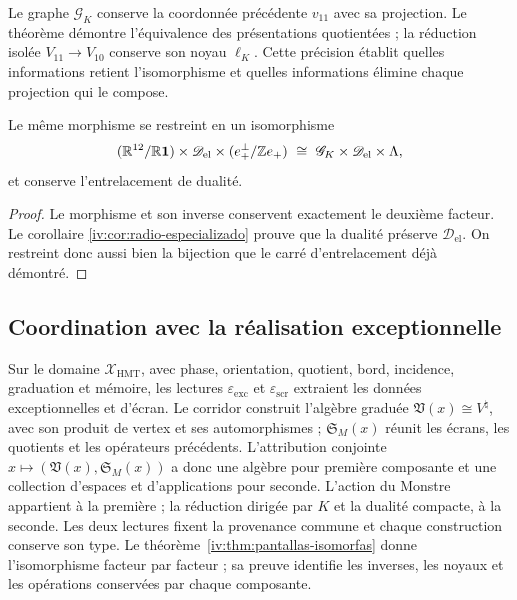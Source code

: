 Le graphe \(\mathscr G_K\) conserve la coordonnée précédente
\(v_{11}\) avec sa projection. Le théorème démontre
l’équivalence des présentations quotientées ; la réduction
isolée \(V_{11}\to V_{10}\) conserve son noyau
\(\ell_K\). Cette précision établit quelles informations
retient l’isomorphisme et quelles informations élimine chaque
projection qui le compose.


\begin{corollary}
Le même morphisme se restreint en un isomorphisme
\[
 (\mathbb R^{12}/\mathbb R\mathbf1)\times\mathscr D_{\mathrm{el}}
 \times(e_+^\perp/\mathbb Z e_+)
 \ \cong\ \mathscr G_K\times\mathscr D_{\mathrm{el}}\times\Lambda,
\]
et conserve l’entrelacement de dualité.
\end{corollary}
\begin{proof}
Le morphisme et son inverse conservent exactement le deuxième facteur.
Le corollaire \ref{iv:cor:radio-especializado} prouve que la dualité
préserve \(\mathscr D_{\mathrm{el}}\). On restreint donc
aussi bien la bijection que le carré d’entrelacement déjà démontré.
\end{proof}

\subsection{Coordination avec la réalisation exceptionnelle}

Sur le domaine \(\mathcal X_{\mathrm{HMT}}\), avec phase, orientation,
quotient, bord, incidence, graduation et mémoire, les lectures
\(\varepsilon_{\mathrm{exc}}\) et \(\varepsilon_{\mathrm{scr}}\) extraient
les données exceptionnelles et d’écran. Le corridor construit l’algèbre
graduée \(\mathfrak V(x)\cong V^\natural\), avec son produit de vertex
et ses automorphismes ; \(\mathfrak S_M(x)\) réunit les écrans, les quotients
et les opérateurs précédents. L’attribution conjointe
\(x\mapsto(\mathfrak V(x),\mathfrak S_M(x))\) a donc une
algèbre pour première composante et une collection d’espaces et d’applications pour seconde.
L’action du Monstre appartient à la première ; la réduction dirigée par \(K\)
et la dualité compacte, à la seconde. Les deux lectures fixent la provenance
commune et chaque construction conserve son type.
Le théorème~\ref{iv:thm:pantallas-isomorfas} donne l’isomorphisme
facteur par facteur ; sa preuve identifie les inverses, les noyaux
et les opérations conservées par chaque composante.

\par\endgroup
